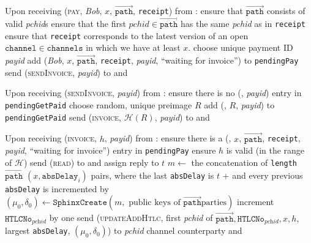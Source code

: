 \begin{algorithmic}[1]
    \State {}
    \State Upon receiving (\textsc{pay}, \textit{Bob}, $x$,
    $\overrightarrow{\mathtt{path}}$, \texttt{receipt}) from \environment:
    \Indent
      \State ensure that $\overrightarrow{\mathtt{path}}$ consists of valid
      \textit{pchid}s
      \State ensure that the first $\mathit{pchid} \in
      \overrightarrow{\mathtt{path}}$ has the same \textit{pchid} as in
      \texttt{receipt}
      \State ensure that \texttt{receipt} corresponds to the latest version of
      an open $\mathtt{channel} \in \mathtt{channels}$ in which we have at least
      $x$.
      \State choose unique payment ID \textit{payid} 
      \State add (\textit{Bob}, $x$, $\overrightarrow{\mathtt{path}}$,
      \texttt{receipt}, \textit{payid}, ``waiting for invoice'') to
      \texttt{pendingPay}
      \State send (\textsc{sendInvoice}, \textit{payid}) to \bob{} and
      \adversary
    \EndIndent
    \State

    \State Upon receiving (\textsc{sendInvoice}, \textit{payid}) from \bob:
    \Indent
      \State ensure there is no (\bob, \textit{payid}) entry in
      \texttt{pendingGetPaid}
      \State choose random, unique preimage $R$
      \State add (\bob, $R$, \textit{payid}) to \texttt{pendingGetPaid}
      \State send (\textsc{invoice}, $\mathcal{H}\left(R\right)$,
      \textit{payid}) to \bob{} and \adversary
    \EndIndent
    \State

    \State Upon receiving (\textsc{invoice}, $h$, \textit{payid}) from \bob:
    \Indent
      \State ensure there is a (\bob, $x$, $\overrightarrow{\mathtt{path}}$,
      \texttt{receipt}, \textit{payid}, ``waiting for invoice'') entry in
      \texttt{pendingPay}
      \State ensure $h$ is valid (in the range of $\mathcal{H}$)
      \State send (\textsc{read}) to \clock{} and assign reply to $t$
      \State $m \gets$ the concatenation of \texttt{length}
      $\overrightarrow{\mathtt{path}}$ $\left(x, \mathtt{absDelay}_i\right)$
      pairs, where the last \texttt{absDelay} is $t$ +  and
      every previous \texttt{absDelay} is incremented by 
      \State $\left(\mu_0, \delta_0\right) \gets \mathtt{SphinxCreate}\left(m,
      \text{ public keys of } \overrightarrow{\mathtt{path}} \text{
      parties}\right)$
      \State increment $\mathtt{HTLCNo}_{\textit{pchid}}$ by one
      \State send (\textsc{updateAddHtlc}, first \textit{pchid} of
      $\overrightarrow{\mathtt{path}}, \mathtt{HTLCNo}_{\textit{pchid}}, x, h,$
      largest \texttt{absDelay}, $\left(\mu_0, \delta_0\right)$) to
      \textit{pchid} channel counterparty and \adversary
    \EndIndent
    \State


\end{algorithmic}
